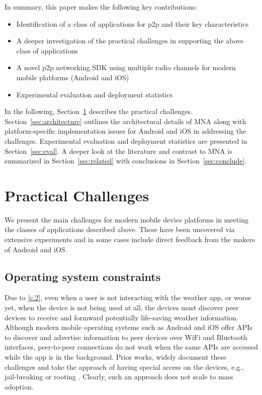 \documentclass[conference]{IEEEtran}
\begin{document}
In summary, this paper makes the following key contributions:
\begin{itemize}
\item Identification of a class of applications for p2p and their key
  characteristics
\item A deeper investigation of the practical challenges in supporting
  the above class of applications
\item A novel p2p networking SDK using multiple radio
  channels for modern mobile platforms (Android and iOS)
\item Experimental evaluation and deployment statistics
\end{itemize}

In the following, Section~\ref{sec:challenges} describes the practical
challenges. Section~\ref{sec:architecture} outlines the architectural
details of MNA along with platform-specific implementation issues for
Android and iOS in addressing the challenges. Experimental evaluation
and deployment statistics are presented in Section~\ref{sec:eval}.  A
deeper look at the literature and contrast to MNA is summarized in
Section~\ref{sec:related} with conclusions in
Section~\ref{sec:conclude}.
%
\section{Practical Challenges}
\label{sec:challenges}
%
We present the main challenges for modern mobile device platforms in
meeting the classes of applications described above. These have been
uncovered via extensive experiments and in some cases include direct
feedback from the makers of Android and iOS.
%
\subsection{Operating system constraints}
\label{ch:os}
%
Due to \ref{c:2}, even when a user is not interacting with the weather
app, or worse yet, when the device is not being used at all, the
devices must discover peer devices to receive and formward potentially
life-saving weather information. Although modern mobile operating
systems such as Android and iOS offer APIs to discover and advertise
information to peer devices over WiFi and Bluetooth interfaces,
peer-to-peer connections do not work when the same APIs are accessed
while the app is in the background. Prior works, widely document these
challenges and take the approach of having special access on the
devices, e.g., jail-breaking or rooting
\cite{gardner-stephen-serval-2011}. Clearly, such an approach does not
scale to mass adoption.
%
\end{document}
